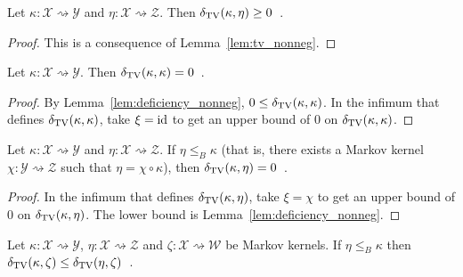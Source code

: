 \begin{lemma}
  \label{lem:deficiency_nonneg}
  Let $\kappa: \mathcal X \rightsquigarrow \mathcal Y$ and $\eta : \mathcal X \rightsquigarrow \mathcal Z$. Then $\delta_{\operatorname{TV}}(\kappa, \eta) \ge 0$~.
\end{lemma}

\begin{proof}%
{}
This is a consequence of Lemma~\ref{lem:tv_nonneg}.
\end{proof}

\begin{lemma}
  \label{lem:deficiency_self}
  Let $\kappa: \mathcal X \rightsquigarrow \mathcal Y$. Then $\delta_{\operatorname{TV}}(\kappa, \kappa) = 0$~.
\end{lemma}

\begin{proof}%
{}
By Lemma~\ref{lem:deficiency_nonneg}, $0 \le \delta_{\operatorname{TV}}(\kappa, \kappa)$.
In the infimum that defines $\delta_{\operatorname{TV}}(\kappa, \kappa)$, take $\xi = \textup{id}$ to get an upper bound of 0 on $\delta_{\operatorname{TV}}(\kappa, \kappa)$.
\end{proof}

\begin{lemma}
  \label{lem:deficiency_comp}
  Let $\kappa: \mathcal X \rightsquigarrow \mathcal Y$ and $\eta : \mathcal X \rightsquigarrow \mathcal Z$.
  If $\eta \le_B \kappa$ (that is, there exists a Markov kernel $\chi : \mathcal Y \rightsquigarrow \mathcal Z$ such that $\eta = \chi \circ \kappa$), then $\delta_{\operatorname{TV}}(\kappa, \eta) = 0$~.
\end{lemma}

\begin{proof}%
{}
In the infimum that defines $\delta_{\operatorname{TV}}(\kappa, \eta)$, take $\xi = \chi$ to get an upper bound of 0 on $\delta_{\operatorname{TV}}(\kappa, \eta)$. The lower bound is Lemma~\ref{lem:deficiency_nonneg}.
\end{proof}

\begin{lemma}
  \label{lem:deficiency_antimono_left}
  Let $\kappa: \mathcal X \rightsquigarrow \mathcal Y$, $\eta : \mathcal X \rightsquigarrow \mathcal Z$ and $\zeta : \mathcal X \rightsquigarrow \mathcal W$ be Markov kernels.
  If $\eta \le_B \kappa$ then $\delta_{\operatorname{TV}}(\kappa, \zeta) \le \delta_{\operatorname{TV}}(\eta, \zeta)$~.
\end{lemma}

